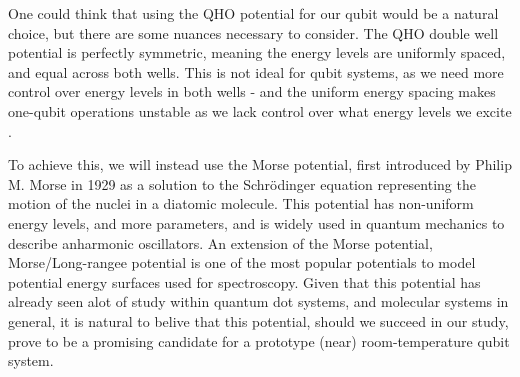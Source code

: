 \documentclass{subfiles}
\begin{document}
One could think that using the QHO potential for our qubit would be a natural choice, but there are some nuances necessary to consider. The QHO double well potential is perfectly symmetric, meaning the energy levels are uniformly spaced, and equal across both wells. This is not ideal for qubit systems, as we need more control over energy levels in both wells - and the uniform energy spacing makes one-qubit operations unstable as we lack control over what energy levels we excite \cite{devoret2013superconducting}. 

To achieve this, we will instead use the Morse potential, first introduced by Philip M. Morse in 1929 as a solution to the Schrödinger equation representing the motion of the nuclei in a diatomic molecule\cite{morse1929diatomic}. This potential has non-uniform energy levels, and more parameters, and is widely used in quantum mechanics to describe anharmonic oscillators. An extension of the Morse potential, Morse/Long-rangee potential is one of the most popular potentials to model potential energy surfaces used for spectroscopy\cite{zhai2018constructing}. Given that this potential has already seen alot of study within quantum dot systems, and molecular systems in general, it is natural to belive that this potential, should we succeed in our study, prove to be a promising candidate for a prototype (near) room-temperature qubit system\cite{khordad2014linear, hayrapetyan2015exciton, sargsian2021effects}. \\
\end{document}
